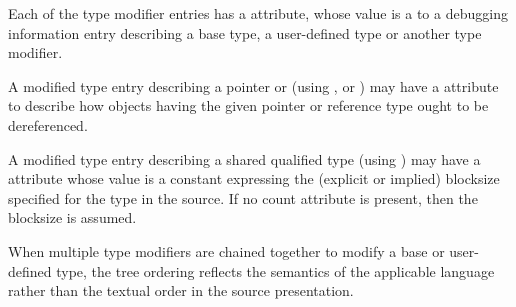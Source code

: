 Each of the type modifier entries has 
a 
\DWATtype{} attribute,
whose value is a  
to a debugging information entry
describing a base type, a user-defined type or another type
modifier.

A modified type entry describing a 
pointer or 
(using \DWTAGpointertype,
\DWTAGreferencetype{} or
\DWTAGrvaluereferencetype) 
may
have 
\hypertarget{chap:DWATadressclasspointerorreferencetypes}{}
a 
\DWATaddressclassDEFN{}
attribute to describe how objects having the given pointer
or reference type ought to be dereferenced.

A modified type entry describing a  shared qualified type
(using \DWTAGsharedtype) may have a
\DWATcount{} attribute
whose value is a constant expressing the (explicit or implied) blocksize specified for the
type in the source. If no count attribute is present, then the 
blocksize is assumed.

When multiple type modifiers are chained together to modify
a base or user-defined type, the tree ordering reflects the
semantics of the 
applicable language 
rather 
than 
the 
textual
order 
in 
the 
source 
presentation.

